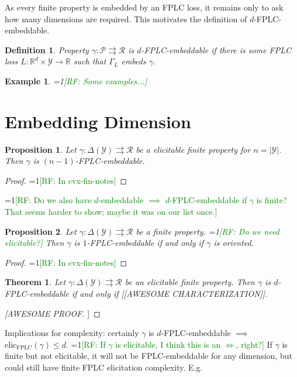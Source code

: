 \documentclass[11pt]{article}
\newcommand{\Comments}{1}
\newcommand{\mynote}[2]{\ifnum\Comments=1\textcolor{#1}{#2}\fi}
\newcommand{\raf}[1]{\mynote{green}{[RF: #1]}}
\newcommand{\reals}{\mathbb{R}}
\renewcommand{\P}{\mathcal{P}}
\newcommand{\R}{\mathcal{R}}
\newcommand{\Y}{\mathcal{Y}}
\newcommand{\toto}{\rightrightarrows}
\newcommand{\FPLC}{\mathrm{FPLC}}
\newcommand{\elic}{\mathrm{elic}}
\newtheorem{theorem}{Theorem}
\newtheorem{proposition}{Proposition}
\newtheorem{definition}{Definition}
\newtheorem{example}{Example}
\begin{document}
As every finite property is embedded by an FPLC loss, it remains only to ask how many dimensions are required.
This motivates the definition of $d$-FPLC-embeddable.

\begin{definition}
  Property $\gamma:\P\toto\R$ is $d$-FPLC-embeddable if there is some FPLC loss $L:\reals^d\times\Y\to\reals$ such that $\Gamma_L$ embeds $\gamma$.
\end{definition}

\begin{example}
  \raf{Some examples...}
\end{example}

\section{Embedding Dimension}

\begin{proposition}
  Let $\gamma:\Delta(\Y)\toto\R$ be a elicitable finite property for $n=|\Y|$.
  Then $\gamma$ is $(n-1)$-FPLC-embeddable.
\end{proposition}
\begin{proof}
  \raf{In cvx-fin-notes}  
\end{proof}

\raf{Do we also have $d$-embeddable $\implies$ $d$-FPLC-embeddable if $\gamma$ is finite?  That seems harder to show; maybe it was on our list once.}

\begin{proposition}
  Let $\gamma:\Delta(\Y)\toto\R$ be a finite property. \raf{Do we need elicitable?}
  Then $\gamma$ is $1$-FPLC-embeddable if and only if $\gamma$ is oriented.
\end{proposition}
\begin{proof}
  \raf{In cvx-fin-notes}
\end{proof}

\begin{theorem}
  Let $\gamma:\Delta(\Y)\toto\R$ be an elicitable finite property.
  Then $\gamma$ is $d$-FPLC-embeddable if and only if [[AWESOME CHARACTERIZATION]].
\end{theorem}
\begin{proof}
  [[AWESOME PROOF]]
\end{proof}

Implications for complexity: certainly $\gamma$ is $d$-FPLC-embeddable $\implies$ $\elic_\FPLC(\gamma) \leq d$.
\raf{If $\gamma$ is elicitable, I think this is an $\iff$, right?}
If $\gamma$ is finite but not elicitable, it will not be FPLC-embeddable for any dimension, but could still have finite FPLC elicitation complexity.
E.g.\ 
\end{document}

